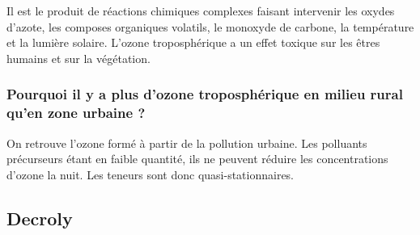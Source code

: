 Il est le produit de réactions chimiques complexes faisant intervenir les oxydes d’azote, les composes organiques volatils, le monoxyde de carbone, la température et la lumière solaire. L’ozone troposphérique a un effet toxique sur les êtres humains et sur la végétation.
\color{black}



\subsubsection{Pourquoi il y a plus d'ozone troposphérique en milieu rural qu'en zone urbaine ?}
\color{cyan}
On retrouve l'ozone formé à partir de la pollution urbaine. Les polluants précurseurs étant en faible quantité, ils ne peuvent réduire les concentrations d'ozone la nuit. Les teneurs sont donc quasi-stationnaires.
\color{black}






\subsection{Decroly}



